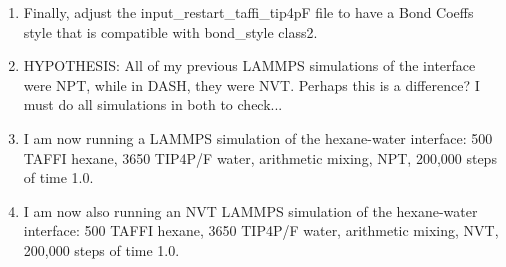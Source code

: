 \documentclass[12pt,reqno]{amsart}
\numberwithin{equation}{section}
\begin{document}
\begin{enumerate}
\item Finally, adjust the input\_restart\_taffi\_tip4pF file to have a Bond Coeffs style that is compatible with bond\_style class2.  

\item HYPOTHESIS: All of my previous LAMMPS	 simulations of the interface were NPT, while in DASH, they were NVT.  Perhaps this is a difference?  I must do all simulations in both to check...

\item I am now running a LAMMPS simulation of the hexane-water interface: 500 TAFFI hexane, 3650 TIP4P/F water, arithmetic mixing, NPT, 200,000 steps of time 1.0.  

\item I am now also running an NVT LAMMPS simulation of the hexane-water interface: 500 TAFFI hexane, 3650 TIP4P/F water, arithmetic mixing, NVT, 200,000 steps of time 1.0.   

\end{enumerate}
\end{document}
